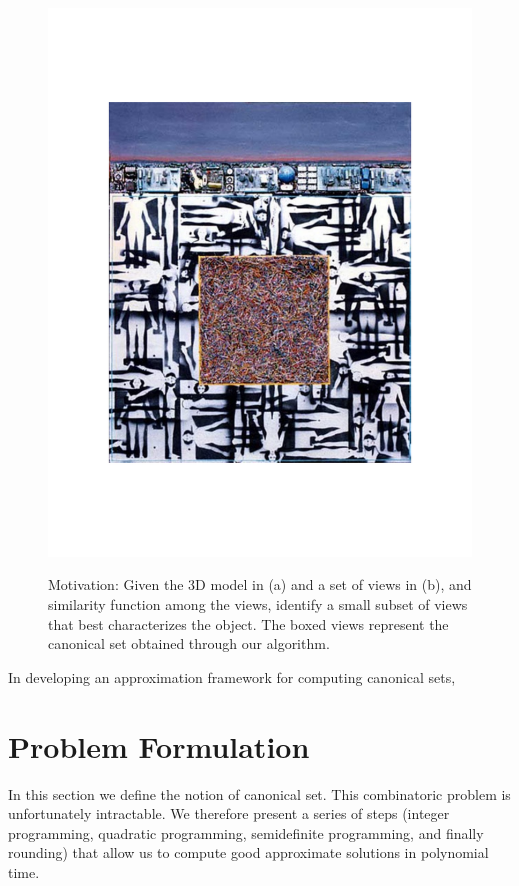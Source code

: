 \documentclass{article}
\begin{document}
\begin{figure}[!ht]
        \centerline{
        \includegraphics[scale=0.5]{img/h001.pdf} \\
   }
        \caption{Motivation: Given the 3D model in (a) and a  set
          of views in (b), and similarity function among the views,
          identify a small subset of views that best characterizes the
          object. The boxed views represent the canonical set obtained
          through our algorithm.}
        \label{fig:canset_motivation}
\end{figure}


                                        

In developing an approximation framework for computing canonical sets,

\vspace{-0.1in}
\section{Problem Formulation}
\label{sec:form}
%
\vspace{-0.1in}
In this section we define the notion of canonical set.  This
combinatoric problem is unfortunately intractable.  We therefore
present a series of steps (integer programming, quadratic programming,
semidefinite programming, and finally rounding) that allow us to
compute good approximate solutions in polynomial time.
\vspace{-0.1in}
\end{document}
